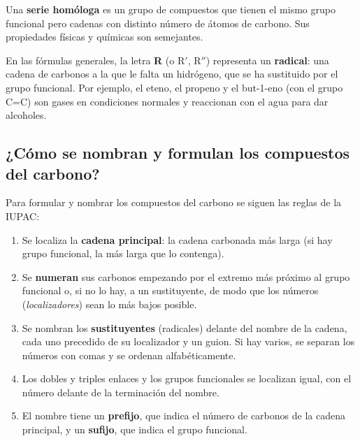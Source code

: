\begin{definition}
    Una \textbf{serie homóloga} es un grupo de compuestos que tienen el mismo grupo funcional pero cadenas con distinto número de átomos de carbono. Sus propiedades físicas y químicas son semejantes.
\end{definition}

En las fórmulas generales, la letra \textbf{R} (o R\('\), R\(''\)) representa un \textbf{radical}: una cadena de carbonos a la que le falta un hidrógeno, que se ha sustituido por el grupo funcional. Por ejemplo, el eteno, el propeno y el but-1-eno (con el grupo C=C) son gases en condiciones normales y reaccionan con el agua para dar alcoholes.

\subsection{¿Cómo se nombran y formulan los compuestos del carbono?}

Para formular y nombrar los compuestos del carbono se siguen las reglas de la IUPAC:
\begin{enumerate}[label=\numberballblue]
    \item Se localiza la \textbf{cadena principal}: la cadena carbonada más larga (si hay grupo funcional, la más larga que lo contenga).
    \item Se \textbf{numeran} sus carbonos empezando por el extremo más próximo al grupo funcional o, si no lo hay, a un sustituyente, de modo que los números (\emph{localizadores}) sean lo más bajos posible.
    \item Se nombran los \textbf{sustituyentes} (radicales) delante del nombre de la cadena, cada uno precedido de su localizador y un guion. Si hay varios, se separan los números con comas y se ordenan alfabéticamente.
    \item Los dobles y triples enlaces y los grupos funcionales se localizan igual, con el número delante de la terminación del nombre.
    \item El nombre tiene un \textbf{prefijo}, que indica el número de carbonos de la cadena principal, y un \textbf{sufijo}, que indica el grupo funcional.
\end{enumerate}

